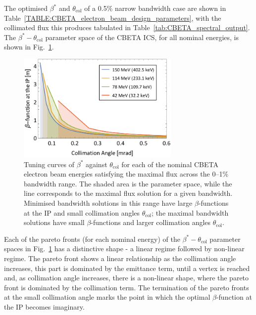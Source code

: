 \documentclass[../main.tex]{subfiles}
\begin{document}
The optimised $\beta^{*}$ and $\theta_{\mathrm{col}}$ of a 0.5\% narrow bandwidth case are shown in Table~\ref{TABLE:CBETA_electron_beam_design_parameters}, with the collimated flux this produces tabulated in Table~\ref{tab:CBETA_spectral_output}. The $\beta^{*}-\theta_{\mathrm{col}}$ parameter space of the CBETA ICS, for all nominal energies, is shown in Fig.~\ref{fig:CBETA_beta_theta_parameter_space}.
\begin{figure}[!h]
\centering
\includegraphics[width=0.7\textwidth]{Figures/CBETA_Inverse_Compton_Source_Design/CBETABetaTheta.pdf}
\caption{Tuning curves of $\beta^{*}$ against $\theta_{\mathrm{col}}$ for each of the nominal CBETA electron beam energies satisfying the maximal flux across the 0--1\% bandwidth range. The shaded area is the parameter space, while the line corresponds to the maximal flux solution for a given bandwidth. Minimised bandwidth solutions in this range have large $\beta$-functions at the IP and small collimation angles $\theta_{\mathrm{col}}$; the maximal bandwidth solutions have small $\beta$-functions and larger collimation angles $\theta_{\mathrm{col}}$.}
\label{fig:CBETA_beta_theta_parameter_space}
\end{figure}

Each of the pareto fronts (for each nominal energy) of the $\beta^{*}-\theta_{\mathrm{col}}$ parameter spaces in Fig.~\ref{fig:CBETA_beta_theta_parameter_space} has a distinctive shape - a linear regime followed by non-linear regime. The pareto front shows a linear relationship as the collimation angle increases, this part is dominated by the emittance term, until a vertex is reached and, as collimation angle increases, there is a non-linear shape, where the pareto front is dominated by the collimation term. The termination of the pareto fronts at the small collimation angle marks the point in which the optimal $\beta$-function at the IP becomes imaginary.
\end{document}

